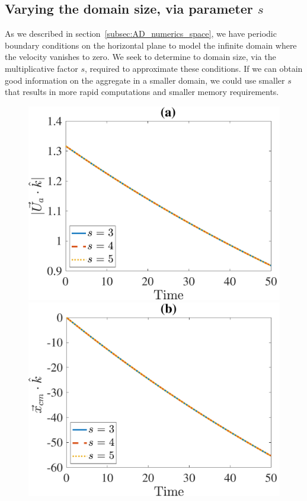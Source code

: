 \subsection{Varying the domain size, via parameter $s$}
As we described in section~\ref{subsec:AD_numerics_space}, we have periodic boundary conditions on the horizontal plane to model the infinite domain where the velocity vanishes to zero. 
We seek to determine to domain size, via the multiplicative factor $s$, required to approximate these conditions.
If we can obtain good information on the aggregate in a smaller domain, we could use smaller $s$ that results in more rapid computations and smaller memory requirements. 
\begin{figure}[ht]
	\begin{center}
		\includegraphics[scale=0.35]{./figures/fig_NC10_s_Ua3_all}
		\includegraphics[scale=0.35]{./figures/fig_NC10_s_cm3_all}

\end{center}
\end{figure}
